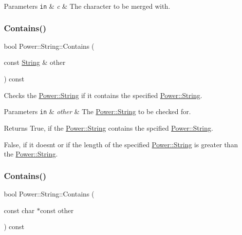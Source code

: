 \begin{DoxyParams}[1]{Parameters}
\mbox{\tt in}  & {\em c} & The character to be merged with. \\
\hline
\end{DoxyParams}
\mbox{\label{class_power_1_1_string_aeaa32e499b49e67539953355b53609a8}} 
\subsubsection{\texorpdfstring{Contains()}{Contains()}\hspace{0.1cm}{\footnotesize\ttfamily [1/4]}}
{\footnotesize\ttfamily bool Power\+::\+String\+::\+Contains (\begin{DoxyParamCaption}\item[{const \hyperlink{class_power_1_1_string}{String} \&}]{other }\end{DoxyParamCaption}) const\hspace{0.3cm}{\ttfamily [inline]}}



Checks the \hyperlink{class_power_1_1_string}{Power\+::\+String} if it contains the specified \hyperlink{class_power_1_1_string}{Power\+::\+String}. 


\begin{DoxyParams}[1]{Parameters}
\mbox{\tt in}  & {\em other} & The \hyperlink{class_power_1_1_string}{Power\+::\+String} to be checked for. \\
\hline
\end{DoxyParams}
\begin{DoxyReturn}{Returns}
True, if the \hyperlink{class_power_1_1_string}{Power\+::\+String} contains the spcified \hyperlink{class_power_1_1_string}{Power\+::\+String}. 

False, if it doesn\textquotesingle{}t or if the length of the specified \hyperlink{class_power_1_1_string}{Power\+::\+String} is greater than the \hyperlink{class_power_1_1_string}{Power\+::\+String}. 
\end{DoxyReturn}
\mbox{\label{class_power_1_1_string_ad90a05c6e07bcd98684bd7c2aec7723f}} 
\subsubsection{\texorpdfstring{Contains()}{Contains()}\hspace{0.1cm}{\footnotesize\ttfamily [2/4]}}
{\footnotesize\ttfamily bool Power\+::\+String\+::\+Contains (\begin{DoxyParamCaption}\item[{const char $\ast$const}]{other }\end{DoxyParamCaption}) const\hspace{0.3cm}{\ttfamily [inline]}}



